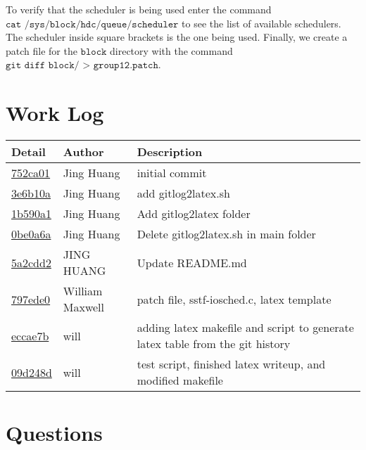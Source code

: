 \documentclass[letterpaper,10pt,titlepage]{article}
\begin{document}
To verify that the scheduler is being used enter the command $\texttt{cat /sys/block/hdc/queue/scheduler}$ to see the list of available schedulers. The scheduler inside square brackets is the one being used.
Finally, we create a patch file for the $\texttt{block}$ directory with the command $\texttt{git diff block/ > group12.patch}$.

\section{Work Log}
\begin{tabular}{l l l}\textbf{Detail} & \textbf{Author} & \textbf{Description}\\\hline
\href{https://github.com/jshota/CS_544_Group12/commit/752ca01c049820caee0c25eee2eb6699199983eb}{752ca01} & Jing Huang & initial commit\\\hline
\href{https://github.com/jshota/CS_544_Group12/commit/3e6b10a07d5478da1326c8cc8946d3b25fe040c9}{3e6b10a} & Jing Huang & add gitlog2latex.sh\\\hline
\href{https://github.com/jshota/CS_544_Group12/commit/1b590a180c992181e8f23ddc2aaa00321a694b9d}{1b590a1} & Jing Huang & Add gitlog2latex folder\\\hline
\href{https://github.com/jshota/CS_544_Group12/commit/0be0a6a594777ab808394a83bdbb58cdb60ba84d}{0be0a6a} & Jing Huang & Delete gitlog2latex.sh in main folder\\\hline
\href{https://github.com/jshota/CS_544_Group12/commit/5a2cdd25c9a62fecf0701252f91d99d940e41357}{5a2cdd2} & JING HUANG & Update README.md\\\hline
\href{https://github.com/jshota/CS_544_Group12/commit/797ede07d6b430b4fd07dba4f45b8c9166f79d48}{797ede0} & William Maxwell & patch file, sstf-iosched.c, latex template\\\hline
\href{https://github.com/jshota/CS_544_Group12/commit/eccae7b130c5ecb9d9ae4aad4287e6b9b74452b7}{eccae7b} & will & adding latex makefile and script to generate latex table from the git history\\\hline
\href{https://github.com/jshota/CS_544_Group12/commit/09d248d7278261ffd7662e0f9a70115dde1230ee}{09d248d} & will & test script, finished latex writeup, and modified makefile\\\hline\end{tabular}

\section{Questions}
\end{document}
